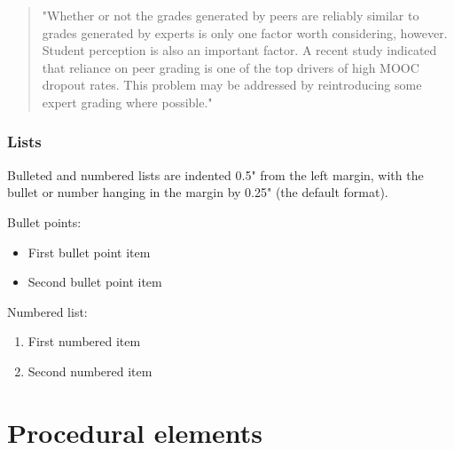 \documentclass[
	letterpaper, %
]{jdf}
\begin{document}
\begin{quotation}
"Whether or not the grades generated by peers are reliably similar to grades generated by experts is only one factor worth considering, however. Student perception is also an important factor. A recent study indicated that reliance on peer grading is one of the top drivers of high MOOC dropout rates. This problem may be addressed by reintroducing some expert grading where possible." \citep{joyner2016}
\end{quotation}

\subsubsection{Lists}
Bulleted and numbered lists are indented 0.5" from the left margin, with the bullet or number hanging in the margin by 0.25" (the default format).

Bullet points:

\begin{itemize}
	\item First bullet point item
	\item Second bullet point item
\end{itemize}

Numbered list:

\begin{enumerate}
	\item First numbered item
	\item Second numbered item
\end{enumerate}

\section{Procedural elements}
\end{document}
